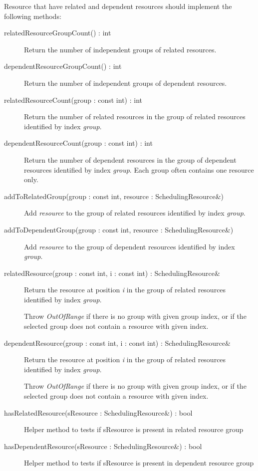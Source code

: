 \documentclass[a4paper,twoside]{tce}
\begin{document}
Resource that have related and dependent resources should implement the
following methods:
\begin{description}
\item[relatedResourceGroupCount() : int]%
  Return the number of independent groups of related resources.
\item[dependentResourceGroupCount() : int]%
  Return the number of independent groups of dependent resources.
\item[relatedResourceCount(group : const int) : int]%
  Return the number of related resources in the group of related resources
  identified by index \emph{group}.
\item[dependentResourceCount(group : const int) : int]%
  Return the number of dependent resources in the group of dependent
  resources identified by index \emph{group}. Each group often contains one
  resource only.
\item[addToRelatedGroup(group : const int, resource : SchedulingResource\&)]%
  Add \emph{resource} to the group of related resources identified by index
  \emph{group}.
\item[addToDependentGroup(group : const int, resource : SchedulingResource\&)]%
  Add \emph{resource} to the group of dependent resources identified by
  index \emph{group}.
\item[relatedResource(group : const int, i : const int) :
  SchedulingResource\&]%
  Return the resource at position \emph{i} in the group of related resources
  identified by index \emph{group}.

  Throw \emph{OutOfRange} if there is no group with given group index, or if
  the selected group does not contain a resource with given index.
\item[dependentResource(group : const int, i : const int) :
  SchedulingResource\&]%
  Return the resource at position \emph{i} in the group of related resources
  identified by index \emph{group}.

  Throw \emph{OutOfRange} if there is no group with given group index, or if
  the selected group does not contain a resource with given index.

\item[hasRelatedResource(sResource : SchedulingResource\&) : bool]%
  Helper method to tests if sResource is present in related resource group
\item[hasDependentResource(sResource : SchedulingResource\&) :
  bool]%
  Helper method to tests if sResource is present in dependent resource group
\end{description}
\end{document}
